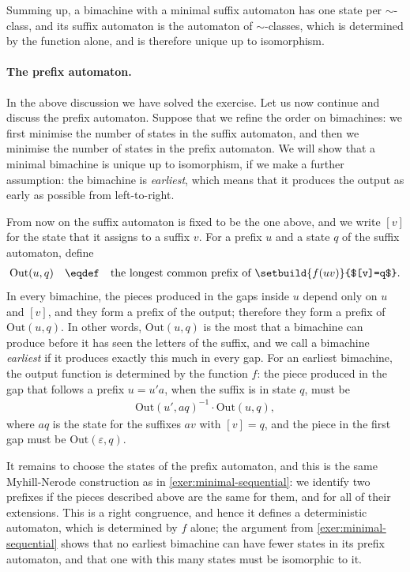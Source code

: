 {    Summing up, a bimachine with a minimal suffix automaton has one state per $\sim$-class, and its suffix automaton is the automaton of $\sim$-classes, which is determined by the function alone, and is therefore unique up to isomorphism.

    \paragraph*{The prefix automaton.} In the above discussion we have solved the exercise. Let us now continue and discuss the prefix automaton. Suppose that we refine the order on bimachines: we first minimise the number of states in the suffix automaton, and then we minimise the number of states in the prefix automaton. We will show that a minimal bimachine is unique up to isomorphism, if we make a further assumption: the bimachine is \emph{earliest}, which means that it produces the output as early as possible from left-to-right. 

    From now on the suffix automaton is fixed to be the one above, and we write $[v]$ for the state that it assigns to a suffix $v$. For a prefix $u$ and a state $q$ of the suffix automaton, define
    \begin{align*}
    \text{Out}(u,q) \quad \eqdef \quad \text{the longest common prefix of } \setbuild{f(uv)}{$[v]=q$}.
    \end{align*}
    In every bimachine, the pieces produced in the gaps inside $u$ depend only on $u$ and $[v]$, and they form a prefix of the output; therefore they form a prefix of $\text{Out}(u,q)$. In other words, $\text{Out}(u,q)$ is the most that a bimachine can produce before it has seen the letters of the suffix, and we call a bimachine \emph{earliest} if it produces exactly this much in every gap. For an earliest bimachine, the output function is determined by the function $f$: the piece produced in the gap that follows a prefix $u = u'a$, when the suffix is in state $q$, must be
    \begin{align*}
    \text{Out}(u', a q)^{-1} \cdot \text{Out}(u,q),
    \end{align*}
    where $aq$ is the state for the suffixes $av$ with $[v]=q$, and the piece in the first gap must be $\text{Out}(\varepsilon,q)$.

    It remains to choose the states of the prefix automaton, and this is the same Myhill-Nerode construction as in \cref{exer:minimal-sequential}: we identify two prefixes if the pieces described above are the same for them, and for all of their extensions. This is a right congruence, and hence it defines a deterministic automaton, which is determined by $f$ alone; the argument from \cref{exer:minimal-sequential} shows that no earliest bimachine can have fewer states in its prefix automaton, and that one with this many states must be isomorphic to it. 
}


